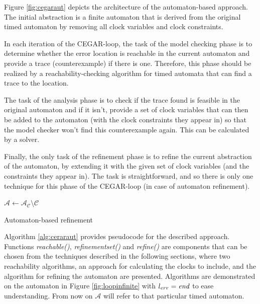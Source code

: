 Figure \ref{fig:cegaraut} depicts the architecture of the automaton-based approach. The initial abstraction is a finite automaton that is derived from the original timed automaton by removing all clock variables and clock constraints. 

In each iteration of the CEGAR-loop, the task of the model checking phase is to determine whether the error location is reachable in the current automaton and provide a trace (counterexample) if there is one. Therefore, this phase should be realized by a reachability-checking algorithm for timed automata that can find a trace to the location.

The task of the analysis phase is to check if the trace found is feasible in the original automaton and if it isn't, provide a set of clock variables that can then be added to the automaton (with the clock constraints they appear in) so that the model checker won't find this counterexample again. This can be calculated by a solver.

Finally, the only task of the refinement phase is to refine the current abstraction of the automaton, by extending it with the given set of clock variables (and the constraints they appear in). The task is straightforward, and so there is only one technique for this phase of the CEGAR-loop (in case of automaton refinement).

\begin{algorithm}
	\BlankLine
	$\mathcal{A} \leftarrow \mathcal{A}_\mathcal{C} \setminus \mathcal{C}$  
	\caption{Automaton-based refinement} \label{alg:ceraraut}
\end{algorithm}


Algorithm \ref{alg:ceraraut} provides pseudocode for the described approach. Functions \emph{reachable()}, \emph{refinementset()} and \emph{refine()} are components that can be chosen from the techniques described in
the following sections, where two reachability algorithms, an approach for calculating the clocks to include, and the algorithm for refining the automaton are presented. Algorithms are demonstrated on the automaton in Figure \ref{fig:loopinfinite} with $l_{err}=\text{\emph{end}}$ to ease understanding. From now on $\mathcal{A}$ will refer to that particular timed automaton.

